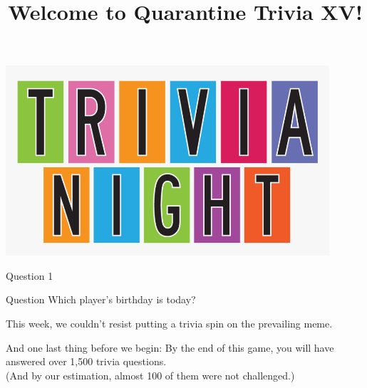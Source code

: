 \documentclass[11pt]{beamer}
\begin{document}
\title{Welcome to Quarantine Trivia XV!}
\date{}

\begin{frame}
\titlepage{}
\begin{center}
\includegraphics[max width=0.9\textwidth,
    max height=0.4\textheight]{Images/triviatitleframelogo.png}
\end{center}
\end{frame}

\begin{frame}[t]{Question 1}
\vspace{-0.5em}
\begin{block}{Question}
Which player's birthday is today?
\end{block}

\end{frame}

\begin{frame}
This week, we couldn't resist putting a trivia spin on the prevailing meme.
\pause{}
\begin{center}
\end{center}
\end{frame}

\begin{frame}
And one last thing before we begin: By the end of this game, you will have answered
over 1,500 trivia questions.
\pause{}
\\
\bigskip
(And by our estimation, almost 100 of them were not \mbox{challenged}.)
\end{frame}
\end{document}
